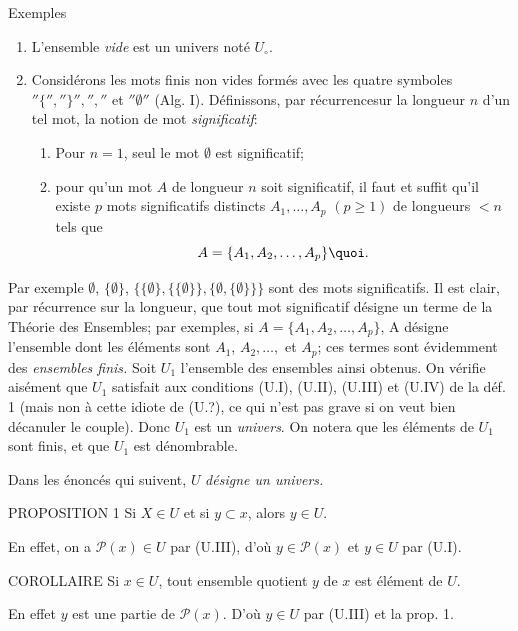 \begin{enonce*}[remark]{Exemples}
\begin{enumerate}
\renewcommand{\labelenumi}{\theenumi)}
\item L'ensemble \emph{vide} est un univers noté $U_\circ$.

\item Considérons les mots finis non vides formés avec les quatre
symboles $''\{'',''\}'','',''$ et $''∅''$ (\cf Alg. I).
Définissons, par récurrence\pageoriginale sur la longueur $n$ d'un
tel mot, la notion de mot \emph{significatif}:
\begin{enumerate}
\renewcommand{\theenumii}{\alph{enumii}}
\renewcommand{\labelenumii}{(\theenumii)}
\item Pour $n=1$, seul le mot $∅$ est significatif;

\item pour qu'un mot $A$ de longueur $n$ soit significatif, il faut et
suffit qu'il existe $p$ mots significatifs distincts
$A_1,\ldots,A_p$ $(p\geq 1)$ de longueurs $<n$ tels que
$$
A=\{A_1,A_2,\ldots,A_p\}{\quoi}.
$$
\end{enumerate}
\end{enumerate}
\end{enonce*}
\noindent Par exemple $∅$, $\{∅\}$,
$\{\{∅\},\{\{∅\}\},\{∅,\{∅\}\}\}$
sont des mots significatifs. Il est clair, par récurrence sur la
longueur, que tout mot significatif désigne un terme de la Théorie
des Ensembles; par exemples, si $A=\{A_1,A_2,\ldots,A_p\}$, A
désigne l'ensemble dont les éléments sont $A_1$, $A_2,\ldots,$ et
$A_p$; ces termes sont évidemment des \emph{ensembles finis.} Soit
$U_1$ l'ensemble des ensembles ainsi obtenus. On vérifie aisément
que $U_1$ satisfait aux conditions (U.I), (U.II), (U.III) et (U.IV)
de la déf. 1 (mais non à cette idiote de (U.?), ce qui n'est pas
grave si on veut bien décanuler le couple). Donc $U_1$ est un
\emph{univers}. On notera que les éléments de $U_1$ sont finis, et
que $U_1$ est dénombrable.

Dans les énoncés qui suivent, $U$ \emph{désigne un univers.}

\begin{enonce*}{PROPOSITION 1}
Si $X\in U$ et si $y\subset x$, alors $y\in U$.
\end{enonce*}
En effet, on a $\mathcal{P}(x)\in U$ par (U.III), d'où $y\in
\mathcal{P}(x)$ et $y\in U$ par (U.I).

\begin{enonce*}{COROLLAIRE}
Si $x\in U$, tout ensemble quotient $y$ de $x$ est élément de $U$.
\end{enonce*}
En effet $y$ est une partie de $\mathcal{P}(x)$. D'où $y\in U$ par
(U.III) et la prop. 1.

